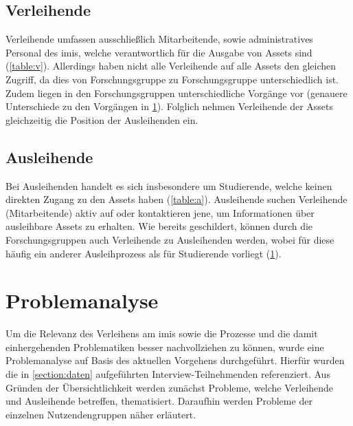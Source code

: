\subsection{Verleihende}
Verleihende umfassen ausschließlich Mitarbeitende, sowie administratives
Personal des \ac{imis}, welche verantwortlich für die Ausgabe von Assets sind
(\ref{table:v}). Allerdings haben nicht alle Verleihende auf alle Assets den
gleichen Zugriff, da dies von Forschungsgruppe zu Forschungsgruppe
unterschiedlich ist. Zudem liegen in den Forschungsgruppen unterschiedliche
Vorgänge vor (genauere Unterschiede zu den Vorgängen in \ref{section:iststand}).
Folglich nehmen Verleihende der Assets gleichzeitig die Position der
Ausleihenden ein.

\subsection{Ausleihende}
Bei Ausleihenden handelt es sich insbesondere um Studierende, welche keinen
direkten Zugang zu den Assets haben (\ref{table:a}). Ausleihende suchen
Verleihende (Mitarbeitende) aktiv auf oder kontaktieren jene, um Informationen
über ausleihbare Assets zu erhalten. Wie bereits geschildert, können durch die
Forschungsgruppen auch Verleihende zu Ausleihenden werden, wobei für diese
häufig ein anderer Ausleihprozess als für Studierende vorliegt
(\ref{section:iststand}).


\section{Problemanalyse}
\label{section:iststand}

Um die Relevanz des Verleihens am \ac{imis} sowie die Prozesse und die damit
einhergehenden Problematiken besser nachvollziehen zu können, wurde eine
Problemanalyse auf Basis des aktuellen Vorgehens durchgeführt. Hierfür wurden
die in \ref{section:daten} aufgeführten Interview-Teilnehmenden referenziert.
Aus Gründen der Übersichtlichkeit werden zunächst Probleme, welche
Verleihende und Ausleihende betreffen, thematisiert. Daraufhin werden Probleme
der einzelnen Nutzendengruppen näher erläutert.

